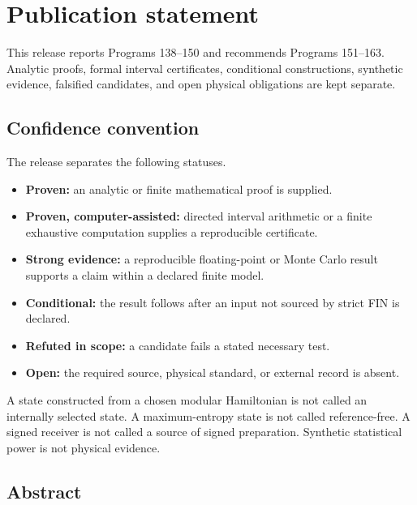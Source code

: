 \documentclass[11pt,a4paper,openany]{report}
\begin{document}
\chapter*{Publication statement}
This release reports Programs 138--150 and recommends Programs 151--163.
Analytic proofs, formal interval certificates, conditional constructions,
synthetic evidence, falsified candidates, and open physical obligations are
kept separate.

\tableofcontents
\clearpage
{}

\section{Confidence convention}

The release separates the following statuses.

\begin{itemize}
\item 
\textbf{Proven:} an analytic or finite mathematical proof is supplied.

\item 
\textbf{Proven, computer-assisted:} directed interval arithmetic or a finite exhaustive computation supplies a reproducible certificate.

\item 
\textbf{Strong evidence:} a reproducible floating-point or Monte Carlo result supports a claim within a declared finite model.

\item 
\textbf{Conditional:} the result follows after an input not sourced by strict FIN is declared.

\item 
\textbf{Refuted in scope:} a candidate fails a stated necessary test.

\item 
\textbf{Open:} the required source, physical standard, or external record is absent.

\end{itemize}

A state constructed from a chosen modular Hamiltonian is not called an internally selected state. A maximum-entropy state is not called reference-free. A signed receiver is not called a source of signed preparation. Synthetic statistical power is not physical evidence.

\section{Abstract}
\end{document}
